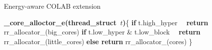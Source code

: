 



\begin{algorithm}
\caption{Energy-aware COLAB extension}
\label{alg:2}
\begin{algorithmic}[]
\STATE \textbf{\_core\_alloctor\_e(thread\_struct\ $t$)}\{
\STATE \textbf{if} t.high\_hyper
\STATE \ \ \textbf{return} rr\_allocator\_(big\_cores)
\STATE \textbf{if} {t.low\_hyper \& t.low\_block}
\STATE \ \ \textbf{return} rr\_allocator\_(little\_cores)
\STATE \textbf{else return} rr\_allocator\_(cores) \}
\end{algorithmic}
\end{algorithm}

